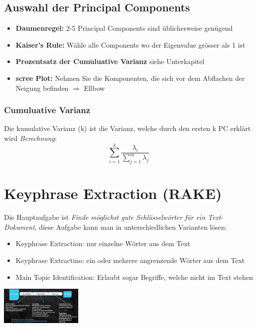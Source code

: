 \documentclass{article}
\newenvironment{Figure}
	{\par\medskip\noindent\minipage{\linewidth}}
	{\endminipage\par\medskip}
\theoremstyle{merke}
\theoremstyle{definition}
\begin{document}
	\subsection{Auswahl der Principal Components}
    \begin{itemize}
        \item \textbf{Daumenregel:} 2-5 Principal Components sind üblicherweise genügend
        \item \textbf{Kaiser's Rule:} Wähle alle Components wo der Eigenvalue grösser als 1 ist
        \item \textbf{Prozentsatz der Cumuluative Varianz} siehe Unterkapitel
        \item \textbf{scree Plot:} Nehmen Sie die Komponenten, die sich vor dem Abflachen der Neigung befinden $\Rightarrow$ Ellbow
    \end{itemize}

		\subsubsection{Cumuluative Varianz}
        Die kumulative Varianz (k) ist die Varianz, welche durch den ersten k PC erklärt wird
        \textit{Berechnung}:
        \begin{equation}
            \sum^{k}_{i=1} \frac{\lambda_i}{\sum^{m}_{j=1} \lambda_j}
        \end{equation}

    \section{Keyphrase Extraction (RAKE)}
    Die Hauptaufgabe ist \textit{Finde möglichst gute Schlüsselwörter für ein Text-Dokument}, diese Aufgabe kann man in unterschiedlichen Varianten lösen:
    \begin{itemize}
        \item Keyphrase Extraction: nur einzelne Wörter aus dem Text
        \item Keyphrase Extractino: ein oder mehrere angrenzende Wörter aus dem Text
        \item Main Topic Identification: Erlaubt sogar Begriffe, welche nicht im Text stehen
    \end{itemize}
    \begin{Figure}
    \centering
    \includegraphics[width=150px]{img/MainPrincipeKeyphraseExtraction.png}
        \label{fig:Hauptprinzip der Keyphrase Extraction}
    \end{Figure}
\end{document}
